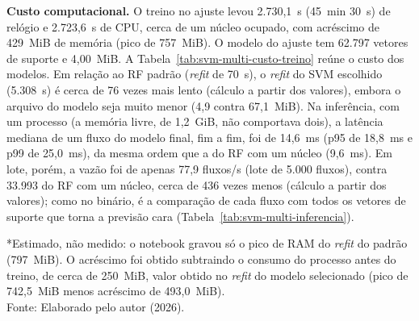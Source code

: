 \documentclass[
    12pt,                %
    openright,           %
    oneside,             %
    a4paper,             %
    english,             %
    brazil               %
]{abntex2}
\begin{document}
\textbf{Custo computacional.} O treino no ajuste levou 2.730,1~s (45~min 30~s) de relógio e 2.723,6~s de CPU, cerca de um núcleo ocupado, com acréscimo de 429~MiB de memória (pico de 757~MiB). O modelo do ajuste tem 62.797 vetores de suporte e 4,00~MiB. A Tabela~\ref{tab:svm-multi-custo-treino} reúne o custo dos modelos. Em relação ao RF padrão (\textit{refit} de 70~s), o \textit{refit} do SVM escolhido (5.308~s) é cerca de 76 vezes mais lento (cálculo a partir dos valores), embora o arquivo do modelo seja muito menor (4,9 contra 67,1~MiB). Na inferência, com um processo (a memória livre, de 1,2~GiB, não comportava dois), a latência mediana de um fluxo do modelo final, fim a fim, foi de 14,6~ms (p95 de 18,8~ms e p99 de 25,0~ms), da mesma ordem que a do RF com um núcleo (9,6~ms). Em lote, porém, a vazão foi de apenas 77,9 fluxos/s (lote de 5.000 fluxos), contra 33.993 do RF com um núcleo, cerca de 436 vezes menos (cálculo a partir dos valores); como no binário, é a comparação de cada fluxo com todos os vetores de suporte que torna a previsão cara (Tabela~\ref{tab:svm-multi-inferencia}).
 
\begin{table}
\centering
\caption{Custo de treino e tamanho dos modelos SVM multiclasse}
\label{tab:svm-multi-custo-treino}
\footnotesize
{}
\par\smallskip
*Estimado, não medido: o notebook gravou só o pico de RAM do \textit{refit} do padrão (797~MiB). O acréscimo foi obtido subtraindo o consumo do processo antes do treino, de cerca de 250~MiB, valor obtido no \textit{refit} do modelo selecionado (pico de 742,5~MiB menos acréscimo de 493,0~MiB).\\
Fonte: Elaborado pelo autor (2026).
\end{table}
 
\end{document}
